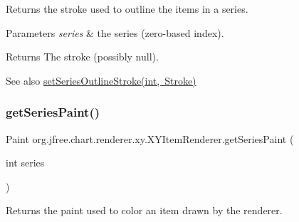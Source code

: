 Returns the stroke used to outline the items in a series.


\begin{DoxyParams}{Parameters}
{\em series} & the series (zero-\/based index).\\
\hline
\end{DoxyParams}
\begin{DoxyReturn}{Returns}
The stroke (possibly {\ttfamily null}).
\end{DoxyReturn}
\begin{DoxySeeAlso}{See also}
\mbox{\hyperlink{interfaceorg_1_1jfree_1_1chart_1_1renderer_1_1xy_1_1_x_y_item_renderer_ad8ab9700d6c753b47123392601e21dd8}{set\+Series\+Outline\+Stroke(int, Stroke)}} 
\end{DoxySeeAlso}
\mbox{\label{interfaceorg_1_1jfree_1_1chart_1_1renderer_1_1xy_1_1_x_y_item_renderer_a8931da4b274b83b939fc55f3f0b664a4}} 
\subsubsection{\texorpdfstring{get\+Series\+Paint()}{getSeriesPaint()}}
{\footnotesize\ttfamily Paint org.\+jfree.\+chart.\+renderer.\+xy.\+X\+Y\+Item\+Renderer.\+get\+Series\+Paint (\begin{DoxyParamCaption}\item[{int}]{series }\end{DoxyParamCaption})}

Returns the paint used to color an item drawn by the renderer.


